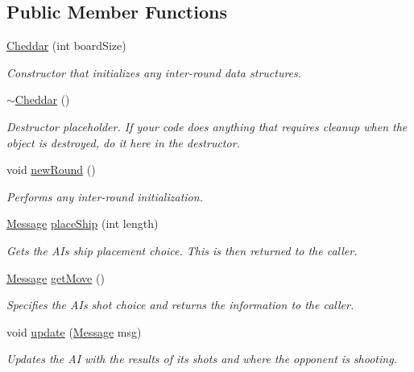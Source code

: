 \subsection*{Public Member Functions}
\begin{DoxyCompactItemize}
\item 
\hyperlink{classCheddar_a648677de898762515334e2c146ae2b74}{Cheddar} (int board\+Size)
\begin{DoxyCompactList}\small\item\em Constructor that initializes any inter-\/round data structures. \end{DoxyCompactList}\item 
\hyperlink{classCheddar_a90b08101bb3e723f9391000afa65cf95}{$\sim$\+Cheddar} ()\hypertarget{classCheddar_a90b08101bb3e723f9391000afa65cf95}{}\label{classCheddar_a90b08101bb3e723f9391000afa65cf95}

\begin{DoxyCompactList}\small\item\em Destructor placeholder. If your code does anything that requires cleanup when the object is destroyed, do it here in the destructor. \end{DoxyCompactList}\item 
void \hyperlink{classCheddar_a3ebbe79cc92ee770c5868eeba6a6c940}{new\+Round} ()\hypertarget{classCheddar_a3ebbe79cc92ee770c5868eeba6a6c940}{}\label{classCheddar_a3ebbe79cc92ee770c5868eeba6a6c940}

\begin{DoxyCompactList}\small\item\em Performs any inter-\/round initialization. \end{DoxyCompactList}\item 
\hyperlink{classMessage}{Message} \hyperlink{classCheddar_a472aeeafaedc457450b4d51f185aacae}{place\+Ship} (int length)
\begin{DoxyCompactList}\small\item\em Gets the AI\textquotesingle{}s ship placement choice. This is then returned to the caller. \end{DoxyCompactList}\item 
\hyperlink{classMessage}{Message} \hyperlink{classCheddar_a603c573f2736063af3dd370886250c83}{get\+Move} ()
\begin{DoxyCompactList}\small\item\em Specifies the AI\textquotesingle{}s shot choice and returns the information to the caller. \end{DoxyCompactList}\item 
void \hyperlink{classCheddar_a2cf8926ec6b1faf842eacfe579c8d080}{update} (\hyperlink{classMessage}{Message} msg)
\begin{DoxyCompactList}\small\item\em Updates the AI with the results of its shots and where the opponent is shooting. \end{DoxyCompactList}\end{DoxyCompactItemize}
